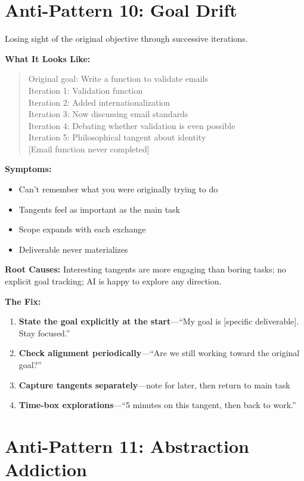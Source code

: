 \section{Anti-Pattern 10: Goal Drift}

Losing sight of the original objective through successive iterations.

\textbf{What It Looks Like:}

\begin{quote}
Original goal: Write a function to validate emails\\
Iteration 1: Validation function\\
Iteration 2: Added internationalization\\
Iteration 3: Now discussing email standards\\
Iteration 4: Debating whether validation is even possible\\
Iteration 5: Philosophical tangent about identity\\
{[Email function never completed]}
\end{quote}

\textbf{Symptoms:}
\begin{itemize}
    \item Can't remember what you were originally trying to do
    \item Tangents feel as important as the main task
    \item Scope expands with each exchange
    \item Deliverable never materializes
\end{itemize}

\textbf{Root Causes:} Interesting tangents are more engaging than boring tasks; no explicit goal tracking; AI is happy to explore any direction.

\textbf{The Fix:}
\begin{enumerate}
    \item \textbf{State the goal explicitly at the start}---``My goal is [specific deliverable]. Stay focused.''
    \item \textbf{Check alignment periodically}---``Are we still working toward the original goal?''
    \item \textbf{Capture tangents separately}---note for later, then return to main task
    \item \textbf{Time-box explorations}---``5 minutes on this tangent, then back to work.''
\end{enumerate}

\section{Anti-Pattern 11: Abstraction Addiction}

